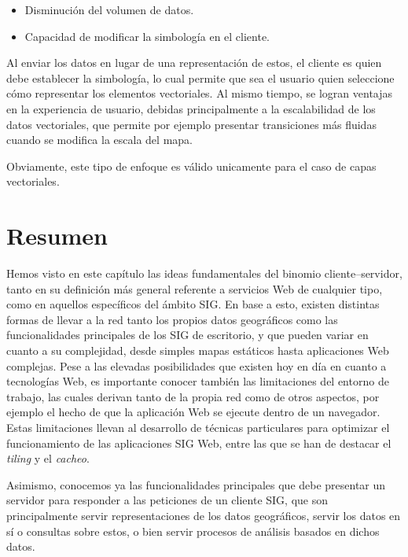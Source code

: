 \begin{itemize}
\item Disminución del volumen de datos. 
\item Capacidad de modificar la simbología en el cliente.
\end{itemize}

Al enviar los datos en lugar de una representación de estos, el cliente es quien debe establecer la simbología, lo cual permite que sea el usuario quien seleccione cómo representar los elementos vectoriales. Al mismo tiempo, se logran ventajas en la experiencia de usuario, debidas principalmente a la escalabilidad de los datos vectoriales, que permite por ejemplo presentar transiciones más fluidas cuando se modifica la escala del mapa.

Obviamente, este tipo de enfoque es válido unicamente para el caso de capas vectoriales.

\section{Resumen}

Hemos visto en este capítulo las ideas fundamentales del binomio cliente--servidor, tanto en su definición más general referente a servicios Web de cualquier tipo, como en aquellos específicos del ámbito SIG. En base a esto, existen distintas formas de llevar a la red tanto los propios datos geográficos como las funcionalidades principales de los SIG de escritorio, y que pueden variar en cuanto a su complejidad, desde simples mapas estáticos hasta aplicaciones Web complejas. Pese a las elevadas posibilidades que existen hoy en día en cuanto a tecnologías Web, es importante conocer también las limitaciones del entorno de trabajo, las cuales derivan tanto de la propia red como de otros aspectos, por ejemplo el hecho de que la aplicación Web se ejecute dentro de un navegador. Estas limitaciones llevan al desarrollo de técnicas particulares para optimizar el funcionamiento de las aplicaciones SIG Web, entre las que se han de destacar el \emph{tiling} y el \emph{cacheo}.

Asimismo, conocemos ya las funcionalidades principales que debe presentar un servidor para responder a las peticiones de un cliente SIG, que son principalmente servir representaciones de los datos geográficos, servir los datos en sí o consultas sobre estos, o bien servir procesos de análisis basados en dichos datos.

\pagestyle{empty}